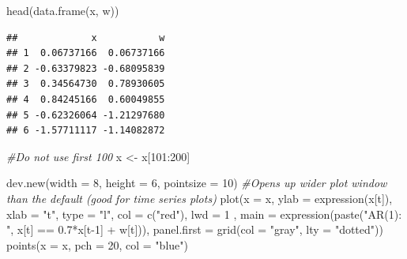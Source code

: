 \documentclass[
]{book}
\newenvironment{Shaded}{\begin{snugshade}}{\end{snugshade}}
\newcommand{\AttributeTok}[1]{\textcolor[rgb]{0.77,0.63,0.00}{#1}}
\newcommand{\CommentTok}[1]{\textcolor[rgb]{0.56,0.35,0.01}{\textit{#1}}}
\newcommand{\DecValTok}[1]{\textcolor[rgb]{0.00,0.00,0.81}{#1}}
\newcommand{\FloatTok}[1]{\textcolor[rgb]{0.00,0.00,0.81}{#1}}
\newcommand{\FunctionTok}[1]{\textcolor[rgb]{0.00,0.00,0.00}{#1}}
\newcommand{\NormalTok}[1]{#1}
\newcommand{\OtherTok}[1]{\textcolor[rgb]{0.56,0.35,0.01}{#1}}
\newcommand{\SpecialCharTok}[1]{\textcolor[rgb]{0.00,0.00,0.00}{#1}}
\newcommand{\StringTok}[1]{\textcolor[rgb]{0.31,0.60,0.02}{#1}}
\theoremstyle{definition}
\theoremstyle{definition}
\theoremstyle{definition}
\theoremstyle{definition}
\theoremstyle{remark}
\begin{document}
\begin{Shaded}
\begin{Highlighting}[]
\FunctionTok{head}\NormalTok{(}\FunctionTok{data.frame}\NormalTok{(x, w))}
\end{Highlighting}
\end{Shaded}

\begin{verbatim}
##             x           w
## 1  0.06737166  0.06737166
## 2 -0.63379823 -0.68095839
## 3  0.34564730  0.78930605
## 4  0.84245166  0.60049855
## 5 -0.62326064 -1.21297680
## 6 -1.57711117 -1.14082872
\end{verbatim}

\begin{Shaded}
\begin{Highlighting}[]
\CommentTok{\#Do not use first 100}
\NormalTok{x }\OtherTok{\textless{}{-}}\NormalTok{ x[}\DecValTok{101}\SpecialCharTok{:}\DecValTok{200}\NormalTok{]}
\end{Highlighting}
\end{Shaded}

\begin{Shaded}
\begin{Highlighting}[]
\FunctionTok{dev.new}\NormalTok{(}\AttributeTok{width =} \DecValTok{8}\NormalTok{, }\AttributeTok{height =} \DecValTok{6}\NormalTok{, }\AttributeTok{pointsize =} \DecValTok{10}\NormalTok{)  }\CommentTok{\#Opens up wider plot window than the default (good for time series plots)}
\FunctionTok{plot}\NormalTok{(}\AttributeTok{x =}\NormalTok{ x, }\AttributeTok{ylab =} \FunctionTok{expression}\NormalTok{(x[t]), }\AttributeTok{xlab =} \StringTok{"t"}\NormalTok{, }\AttributeTok{type =} 
      \StringTok{"l"}\NormalTok{, }\AttributeTok{col =} \FunctionTok{c}\NormalTok{(}\StringTok{"red"}\NormalTok{), }\AttributeTok{lwd =} \DecValTok{1}\NormalTok{ , }\AttributeTok{main =} 
      \FunctionTok{expression}\NormalTok{(}\FunctionTok{paste}\NormalTok{(}\StringTok{"AR(1): "}\NormalTok{, x[t] }\SpecialCharTok{==} \FloatTok{0.7}\SpecialCharTok{*}\NormalTok{x[t}\DecValTok{{-}1}\NormalTok{] }\SpecialCharTok{+} 
\NormalTok{      w[t])), }\AttributeTok{panel.first =} \FunctionTok{grid}\NormalTok{(}\AttributeTok{col =} \StringTok{"gray"}\NormalTok{, }\AttributeTok{lty =} 
      \StringTok{"dotted"}\NormalTok{))}
\FunctionTok{points}\NormalTok{(}\AttributeTok{x =}\NormalTok{ x, }\AttributeTok{pch =} \DecValTok{20}\NormalTok{, }\AttributeTok{col =} \StringTok{"blue"}\NormalTok{)}
\end{Highlighting}
\end{Shaded}
\end{document}
